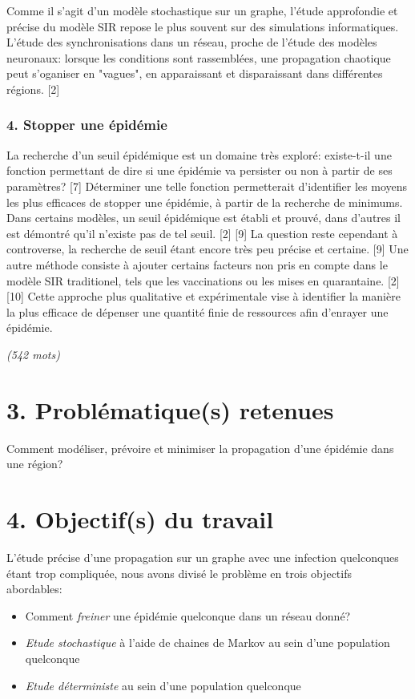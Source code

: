 \documentclass{article}
\begin{document}
Comme il s'agit d'un modèle stochastique sur un graphe, l'étude approfondie et précise du modèle SIR repose le plus souvent sur des simulations informatiques. L'étude des synchronisations dans un réseau, proche de l'étude des modèles neuronaux: lorsque les conditions sont rassemblées, une propagation chaotique peut s'oganiser en "vagues", en apparaissant et disparaissant dans différentes régions. [2]

\subsubsection*{4. Stopper une épidémie}

La recherche d'un seuil épidémique est un domaine très exploré: existe-t-il une fonction permettant de dire si une épidémie va persister ou non à partir de ses paramètres? [7] Déterminer une telle fonction permetterait d'identifier les moyens les plus efficaces de stopper une épidémie, à partir de la recherche de minimums. Dans certains modèles, un seuil épidémique est établi et prouvé, dans d'autres il est démontré qu'il n'existe pas de tel seuil. [2] [9] La question reste cependant à controverse, la recherche de seuil étant encore très peu précise et certaine. [9] Une autre méthode consiste à ajouter certains facteurs non pris en compte dans le modèle SIR traditionel, tels que les vaccinations ou les mises en quarantaine. [2] [10] Cette approche plus qualitative et expérimentale vise à identifier la manière la plus efficace de dépenser une quantité finie de ressources afin d'enrayer une épidémie.

\textit{(542 mots)}

\section*{3. Problématique(s) retenues}

Comment modéliser, prévoire et minimiser la propagation d'une épidémie dans une région?

\section*{4. Objectif(s) du travail}

L'étude précise d'une propagation sur un graphe avec une infection quelconques étant trop compliquée, nous avons divisé le problème en trois objectifs abordables:


\begin{itemize}
\item  Comment \textit{freiner} une épidémie quelconque dans un réseau donné?
\item  \textit{Etude stochastique} à l'aide de chaines de Markov au sein d'une population quelconque
\item  \textit{Etude déterministe} au sein d'une population quelconque

\end{itemize}
\end{document}
